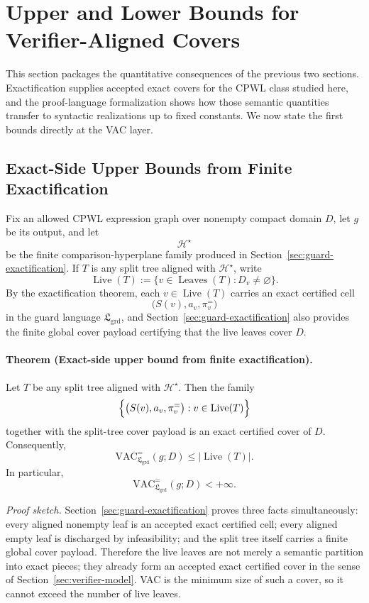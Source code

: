 \documentclass{article}
\begin{document}
\section{Upper and Lower Bounds for Verifier-Aligned Covers}\label{sec:vac-bounds}

This section packages the quantitative consequences of the previous two sections. Exactification supplies accepted exact covers for the CPWL class studied here, and the proof-language formalization shows how those semantic quantities transfer to syntactic realizations up to fixed constants. We now state the first bounds directly at the VAC layer.

\subsection{Exact-Side Upper Bounds from Finite Exactification}

Fix an allowed CPWL expression graph over nonempty compact domain $D$, let $g$ be its output, and let
\[
\mathcal H^\star
\]
be the finite comparison-hyperplane family produced in Section~\ref{sec:guard-exactification}. If $T$ is any split tree aligned with $\mathcal H^\star$, write
\[
\operatorname{Live}(T)
:=
\{v\in \operatorname{Leaves}(T): D_v\neq\varnothing\}.
\]
By the exactification theorem, each $v\in \operatorname{Live}(T)$ carries an exact certified cell
\[
\bigl(S(v),a_v,\pi_v^{=}\bigr)
\]
in the guard language $\mathfrak L_{\mathrm{grd}}$, and Section~\ref{sec:guard-exactification} also provides the finite global cover payload certifying that the live leaves cover $D$.

\paragraph{Theorem (Exact-side upper bound from finite exactification).}
Let $T$ be any split tree aligned with $\mathcal H^\star$. Then the family
\[
\Bigl\{\bigl(S(v),a_v,\pi_v^{=}\bigr): v\in \operatorname{Live}(T)\Bigr\}
\]
together with the split-tree cover payload is an exact certified cover of $D$. Consequently,
\[
\mathrm{VAC}^{=}_{\mathfrak L_{\mathrm{grd}}}(g;D)
\le
|\operatorname{Live}(T)|.
\]
In particular,
\[
\mathrm{VAC}^{=}_{\mathfrak L_{\mathrm{grd}}}(g;D)<+\infty.
\]

\smallskip
\noindent\emph{Proof sketch.}
Section~\ref{sec:guard-exactification} proves three facts simultaneously: every aligned nonempty leaf is an accepted exact certified cell; every aligned empty leaf is discharged by infeasibility; and the split tree itself carries a finite global cover payload. Therefore the live leaves are not merely a semantic partition into exact pieces; they already form an accepted exact certified cover in the sense of Section~\ref{sec:verifier-model}. VAC is the minimum size of such a cover, so it cannot exceed the number of live leaves.
\end{document}
